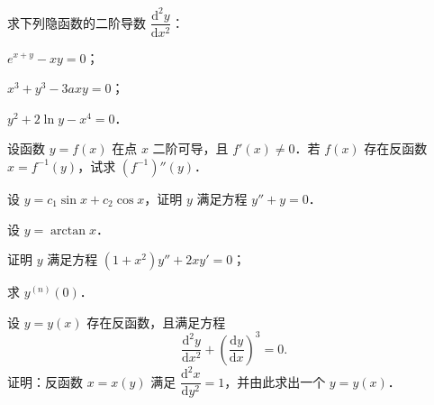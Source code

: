 \begin{xiti}
\item 求下列隐函数的二阶导数 $\dfrac{\mathrm{d}^{2}y}{\mathrm{d}x^{2}}$：
\begin{ziti}
\item $e^{x+y}-xy=0$；
\item $x^{3}+y^{3}-3axy=0$；
\item $y^{2}+2\ln y-x^{4}=0$．
\end{ziti}

\item 设函数 $y=f(x)$ 在点 $x$ 二阶可导，且 $f'(x)\neq0$．若 $f(x)$ 存在反函数 $x=f^{-1}(y)$，试求 $(f^{-1})''(y)$．

\item 设 $y=c_{1}\sin x+c_{2}\cos x$，证明 $y$ 满足方程 $y''+y=0$．

\item 设 $y=\arctan x$．
\begin{ziti}
\item 证明 $y$ 满足方程 $(1+x^{2})y''+2xy'=0$；
\item 求 $y^{(n)}(0)$．
\end{ziti}

\item 设 $y=y(x)$ 存在反函数，且满足方程
\[
\frac{\mathrm{d}^{2}y}{\mathrm{d}x^{2}}+\left(\frac{\mathrm{d}y}{\mathrm{d}x}\right)^{3}=0.
\]
证明：反函数 $x=x(y)$ 满足 $\dfrac{\mathrm{d}^{2}x}{\mathrm{d}y^{2}}=1$，并由此求出一个 $y=y(x)$．
\end{xiti}

